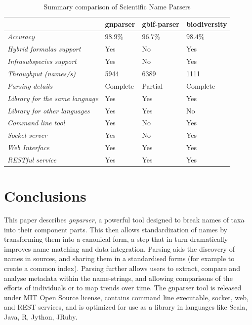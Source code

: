 \documentclass{bmcart}
\begin{document}
\begin{table}[htb]
  \begin{center}
    \caption{Summary comparison of Scientific Name Parsers}
    \label{table:summary}
    \resizebox{12.5cm}{!} {
    \begin{tabular}{|l|*{3}{l}|}
      \hline
                             & gnparser & gbif-parser & biodiversity \\
      \hline
      \textit{Accuracy}                     & $98.9\%$ & $96.7\%$ & $98.4\%$\\
      \textit{Hybrid formulas support}      & Yes      & No       & Yes     \\
      \textit{Infrasubspecies support}      & Yes      & No       & Yes     \\
      \textit{Throughput (names/s)}         & 5944     & 6389     & 1111    \\
      \textit{Parsing details}              & Complete & Partial  & Complete\\
      \textit{Library for the same language}& Yes      & Yes      & Yes     \\
      \textit{Library for other languages}  & Yes      & Yes      & No      \\
      \textit{Command line tool}            & Yes      & No       & Yes     \\
      \textit{Socket server}                & Yes      & No       & Yes     \\
      \textit{Web Interface}                & Yes      & Yes      & Yes     \\
      \textit{RESTful service}              & Yes      & Yes      & Yes     \\
      \hline
    \end{tabular}
  }
  \end{center}
\end{table}

\section*{Conclusions}

This paper describes  \textit{gnparser}, a powerful tool designed to break names of taxa into their component parts.  This then allows standardization of names by transforming them into a canonical form, a step that in turn dramatically improves name
matching and data integration. Parsing aids the discovery of names in
sources, and sharing them in a standardised forms (for example to create a common index).
Parsing further allows users to extract, compare and analyse metadata within the name-strings, and allowing comparisons of the efforts of individuals or to map trends over time. The gnparser tool is released under MIT Open Source license, contains command
line executable, socket, web, and REST services, and is optimized for use as a
library in languages like Scala, Java, R, Jython, JRuby.
\end{document}
